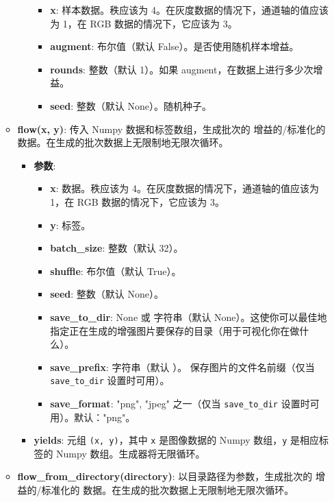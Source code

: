 \begin{itemize}
\begin{itemize}
\begin{itemize}
      \begin{itemize}
      \tightlist
      \item
        \textbf{x}: 样本数据。秩应该为
        4。在灰度数据的情况下，通道轴的值应该为 1，在 RGB
        数据的情况下，它应该为 3。
      \item
        \textbf{augment}: 布尔值（默认 False）。是否使用随机样本增益。
      \item
        \textbf{rounds}: 整数（默认 1）。如果
        augment，在数据上进行多少次增益。
      \item
        \textbf{seed}: 整数（默认 None）。随机种子。
      \end{itemize}
    \end{itemize}
  \item
    \textbf{flow(x, y)}: 传入 Numpy 数据和标签数组，生成批次的
    增益的/标准化的 数据。在生成的批次数据上无限制地无限次循环。

    \begin{itemize}
    \tightlist
    \item
      \textbf{参数}:

      \begin{itemize}
      \tightlist
      \item
        \textbf{x}: 数据。秩应该为
        4。在灰度数据的情况下，通道轴的值应该为 1，在 RGB
        数据的情况下，它应该为 3。
      \item
        \textbf{y}: 标签。
      \item
        \textbf{batch\_size}: 整数（默认 32）。
      \item
        \textbf{shuffle}: 布尔值（默认 True）。
      \item
        \textbf{seed}: 整数（默认 None）。
      \item
        \textbf{save\_to\_dir}: None 或 字符串（默认
        None）。这使你可以最佳地指定正在生成的增强图片要保存的目录（用于可视化你在做什么）。
      \item
        \textbf{save\_prefix}: 字符串（默认
        \texttt{\textquotesingle{}\textquotesingle{}}）。
        保存图片的文件名前缀（仅当 \texttt{save\_to\_dir} 设置时可用）。
      \item
        \textbf{save\_format}: "png", "jpeg" 之一（仅当
        \texttt{save\_to\_dir} 设置时可用）。默认："png"。
      \end{itemize}
    \item
      \textbf{yields}: 元组 \texttt{(x,\ y)}，其中 \texttt{x}
      是图像数据的 Numpy 数组，\texttt{y} 是相应标签的 Numpy
      数组。生成器将无限循环。
    \end{itemize}
  \item
    \textbf{flow\_from\_directory(directory)}:
    以目录路径为参数，生成批次的 增益的/标准化的
    数据。在生成的批次数据上无限制地无限次循环。


\end{itemize}
\end{itemize}
